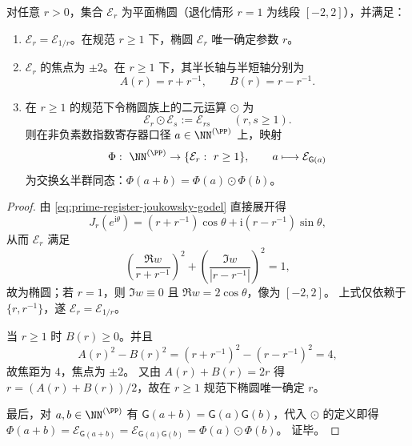\begin{proposition}\label{prop:prime-register-godel-joukowsky-ellipse}
对任意 \(r>0\)，集合 \(\mathcal E_r\) 为平面椭圆（退化情形 \(r=1\) 为线段 \([-2,2]\)），并满足：
\begin{enumerate}
  \item \(\mathcal E_r=\mathcal E_{1/r}\)。在规范 \(r\ge 1\) 下，椭圆 \(\mathcal E_r\) 唯一确定参数 \(r\)。
  \item \(\mathcal E_r\) 的焦点为 \(\pm 2\)。在 \(r\ge 1\) 下，其半长轴与半短轴分别为
  \[
  A(r)=r+r^{-1},\qquad B(r)=r-r^{-1}.
  \]
  \item 在 \(r\ge 1\) 的规范下令椭圆族上的二元运算 \(\odot\) 为
  \[
  \mathcal E_r\odot \mathcal E_s:=\mathcal E_{rs}\qquad (r,s\ge 1).
  \]
  则在非负素数指数寄存器口径 \(a\in\NN^{(\PP)}\) 上，映射
  \[
  \Phi:\ \NN^{(\PP)}\to \{\mathcal E_r:\ r\ge 1\},\qquad a\longmapsto \mathcal E_{\mathsf{G}(a)}
  \]
  为交换幺半群同态：\(\Phi(a+b)=\Phi(a)\odot\Phi(b)\)。
\end{enumerate}
\end{proposition}
\begin{proof}
由 \eqref{eq:prime-register-joukowsky-godel} 直接展开得
\[
J_r(e^{\mathrm{i}\theta})
=(r+r^{-1})\cos\theta+\mathrm{i}(r-r^{-1})\sin\theta,
\]
从而 \(\mathcal E_r\) 满足
\[
\left(\frac{\Re w}{r+r^{-1}}\right)^2+\left(\frac{\Im w}{|r-r^{-1}|}\right)^2=1,
\]
故为椭圆；若 \(r=1\)，则 \(\Im w\equiv 0\) 且 \(\Re w=2\cos\theta\)，像为 \([-2,2]\)。
上式仅依赖于 \(\{r,r^{-1}\}\)，遂 \(\mathcal E_r=\mathcal E_{1/r}\)。
\par
当 \(r\ge 1\) 时 \(B(r)\ge 0\)。并且
\[
A(r)^2-B(r)^2=(r+r^{-1})^2-(r-r^{-1})^2=4,
\]
故焦距为 \(4\)，焦点为 \(\pm 2\)。
又由 \(A(r)+B(r)=2r\) 得 \(r=(A(r)+B(r))/2\)，故在 \(r\ge 1\) 规范下椭圆唯一确定 \(r\)。
\par
最后，对 \(a,b\in\NN^{(\PP)}\) 有 \(\mathsf{G}(a+b)=\mathsf{G}(a)\mathsf{G}(b)\)，代入 \(\odot\) 的定义即得
\(\Phi(a+b)=\mathcal E_{\mathsf{G}(a+b)}=\mathcal E_{\mathsf{G}(a)\mathsf{G}(b)}=\Phi(a)\odot\Phi(b)\)。
证毕。
\end{proof}

